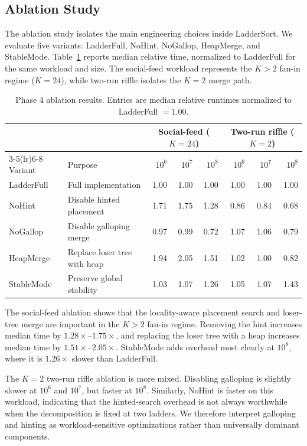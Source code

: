 \documentclass[10pt]{article}
\begin{document}
\subsection{Ablation Study}
\label{ablation-study}

The ablation study isolates the main engineering choices inside LadderSort.
We evaluate five variants: LadderFull, NoHint, NoGallop, HeapMerge, and
StableMode. Table~\ref{tab:phase4-ablation} reports median relative time,
normalized to LadderFull for the same workload and size. The social-feed
workload represents the \(K>2\) fan-in regime (\(K=24\)), while two-run
riffle isolates the \(K=2\) merge path.

\begin{table}[H]
\centering
\small
\caption{Phase 4 ablation results. Entries are median relative runtimes normalized to LadderFull \(=1.00\).}
\label{tab:phase4-ablation}
\begin{tabularx}{\linewidth}{@{}l X rrr rrr@{}}
\toprule
& & \multicolumn{3}{c}{Social-feed (\(K=24\))} & \multicolumn{3}{c}{Two-run riffle (\(K=2\))} \\
\cmidrule(lr){3-5}\cmidrule(lr){6-8}
Variant & Purpose & \(10^6\) & \(10^7\) & \(10^8\) & \(10^6\) & \(10^7\) & \(10^8\) \\
\midrule
LadderFull & Full implementation & 1.00 & 1.00 & 1.00 & 1.00 & 1.00 & 1.00 \\
NoHint & Disable hinted placement & 1.71 & 1.75 & 1.28 & 0.86 & 0.84 & 0.68 \\
NoGallop & Disable galloping merge & 0.97 & 0.99 & 0.72 & 1.07 & 1.06 & 0.79 \\
HeapMerge & Replace loser tree with heap & 1.94 & 2.05 & 1.51 & 1.02 & 1.00 & 0.82 \\
StableMode & Preserve global stability & 1.03 & 1.07 & 1.26 & 1.05 & 1.07 & 1.43 \\
\bottomrule
\end{tabularx}
\end{table}

The social-feed ablation shows that the locality-aware placement search and
loser-tree merge are important in the \(K>2\) fan-in regime. Removing the hint
increases median time by \(1.28\times\)--\(1.75\times\), and replacing the loser
tree with a heap increases median time by \(1.51\times\)--\(2.05\times\).
StableMode adds overhead most clearly at \(10^8\), where it is \(1.26\times\)
slower than LadderFull.

The \(K=2\) two-run riffle ablation is more mixed. Disabling galloping is
slightly slower at \(10^6\) and \(10^7\), but faster at \(10^8\). Similarly,
NoHint is faster on this workload, indicating that the hinted-search overhead
is not always worthwhile when the decomposition is fixed at two ladders. We
therefore interpret galloping and hinting as workload-sensitive optimizations
rather than universally dominant components.
\end{document}
